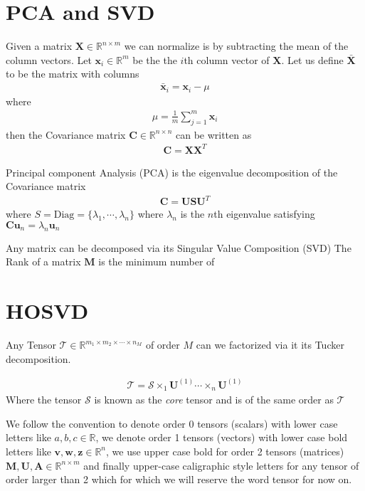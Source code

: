 \section{PCA and SVD}
Given a matrix $\mathbf{X}\in\mathbb{R}^{n\times m}$ we can normalize is by subtracting the mean of the column vectors. Let $\mathbf{x}_i\in\mathbb{R}^{m}$ be the the $i$th column vector of $\mathbf{X}$. Let us define $\bar{\mathbf{X}}$ to be the matrix with columns
\begin{align}
  \bar{\mathbf{x}}_i = \mathbf{x}_i - \mu
\end{align}
where
\begin{align}
  \mu = \frac{1}{m}\sum_{j=1}^m \mathbf{x}_i
\end{align}
then the Covariance matrix $\mathbf{C} \in \mathbb{R}^{n\times n}$ can be written as
\begin{align}
  \mathbf{C} = \mathbf{X}\mathbf{X}^T
\end{align}

Principal component Analysis (PCA) is the eigenvalue decomposition of the Covariance matrix
\begin{align}
\mathbf{C} = \mathbf{U}\mathbf{S}\mathbf{U}^T
\end{align}
where $S=\text{Diag} = \{\lambda_1,\cdots,\lambda_n\}$ where $\lambda_n$ is the $n$th eigenvalue satisfying $\mathbf{C}\mathbf{u}_{n} = \lambda_n \mathbf{u}_{n}$

Any matrix can be decomposed via its Singular Value Composition (SVD)
The Rank of a matrix $\mathbf{M}$ is the minimum number of



\section{HOSVD}

Any Tensor $\mathcal{T} \in \mathbb{R}^{m_1\times m_2 \times \cdots \times n_M}$ of order $M$ can we factorized via it its Tucker decomposition.

\begin{align}
  \mathcal{T} = \mathcal{S} \times_1 \mathbf{U}^{(1)} \cdots  \times_n \mathbf{U}^{(1)} 
\end{align}
Where the tensor $\mathcal{S}$ is known as the \emph{core} tensor and is of the same order as $\mathcal{T}$


We follow the convention to denote order 0 tensors (scalars) with lower case letters like $a,b,c \in \mathbb{R}$, we denote order 1 tensors (vectors) with lower case bold letters like $\mathbf{v},\mathbf{w},\mathbf{z} \in \mathbb{R}^{n}$, we use upper case bold for order 2 tensors (matrices)  $\mathbf{M},\mathbf{U},\mathbf{A} \in \mathbb{R}^{n\times m}$ and finally upper-case caligraphic style letters for any tensor of order larger than 2 which for which we will reserve the word tensor for now on.
